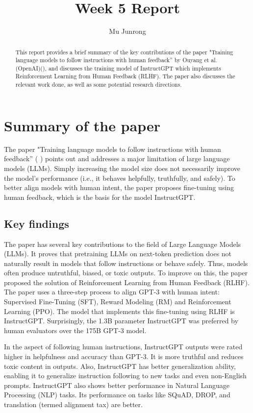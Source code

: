 \documentclass{article} %
\title{Week 5 Report}
\author{Mu Junrong}
\begin{document}
\ifcolmsubmission
\linenumbers
\fi

\maketitle

\begin{abstract}
This report provides a brief summary of the key contributions of the paper "Training language models to follow instructions with human feedback” by Ouyang et al. (OpenAI)(\cite{ouyang2022instructgpt}), and discusses the training model of InstructGPT which implements Reinforcement Learning from Human Feedback (RLHF). The paper also discusses the relevant work done, as well as some potential research directions.
\end{abstract}

\section{Summary of the paper}
The paper "Training language models to follow instructions with human feedback” (
\cite{ouyang2022instructgpt}) points out and addresses a major limitation of large language models (LLMs). Simply increasing the model size does not necessarily improve the model's performance (i.e., it behaves helpfully, truthfully, and safely). To better align models with human intent, the paper proposes fine-tuning using human feedback, which is the basis for the model InstructGPT.

\subsection{Key findings}
The paper has several key contributions to the field of Large Language Models (LLMs). It proves that pretraining LLMs on next-token prediction does not naturally result in models that follow instructions or behave safely. Thus, models often produce untruthful, biased, or toxic outputs. To improve on this, the paper proposed the solution of Reinforcement Learning from Human Feedback (RLHF). The paper uses a three-step process to align GPT-3 with human intent: Supervised Fine-Tuning (SFT), Reward Modeling (RM) and Reinforcement Learning (PPO). The model that implements this fine-tuning using RLHF is InstructGPT. Surprisingly, the 1.3B parameter InstructGPT was preferred by human evaluators over the 175B GPT-3 model.

In the aspect of following human instructions, InstructGPT outputs were rated higher in helpfulness and accuracy than GPT-3. It is more truthful and reduces toxic content in outputs. Also, InstructGPT has better generalization ability, enabling it to generalize instruction following to new tasks and even non-English prompts. InstructGPT also shows better performance in Natural Language Processing (NLP) tasks. Its performance on tasks like SQuAD, DROP, and translation (termed alignment tax) are better.
\end{document}
